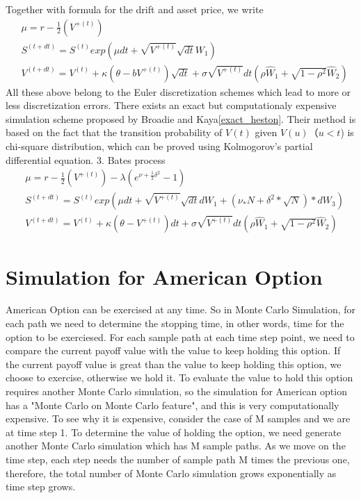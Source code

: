 \documentclass[a4paper]{article}
\begin{document}
Together with formula for the drift and asset price, we write
\begin{align*}
	& \mu = r - \frac{1}{2} (V^{+(t)})\\
	& S^{(t + dt)} = S^{(t)}exp(\mu dt + \sqrt{V^{+(t)}} \sqrt{dt} W_1) \\
	& V^{(t + dt)} = V^{(t)} + \kappa (\theta - b V^{+(t)}) \sqrt{dt} + \sigma \sqrt{V^{+(t)}} dt (\rho \hat W_1
	+ \sqrt{1 - \rho^2} \hat W_2) 
\end{align*}
All these above belong to the Euler discretization schemes which lead to more or less discretization errors. There exists an exact but computationaly expensive simulation scheme proposed by Broadie and Kaya\ref{exact_heston}. Their method is based on the fact that the transition probability of $V(t)$ given $V(u)$（$u < t$) is chi-square distribution, which can be proved using Kolmogorov's partial differential equation. %
3. Bates process\\
\begin{align*}
	& \mu = r - \frac{1}{2} (V^{+(t)}) - \lambda (e^{\nu + \frac{1}{2}\delta^2}  -1) \\
	& S^{(t + dt)} = S^{(t)}exp(\mu dt  + \sqrt{V^{+(t)}} \sqrt{dt} dW_1 
	   + (\nu_*N+\delta^2*\sqrt{N})*dW_3)\\
	& V^{(t + dt)} = V^{(t)} + \kappa(\theta -  V^{+(t)}) dt + \sigma \sqrt{V^{+(t)}} dt (\rho \hat W_1
	+ \sqrt{1 - \rho^2} \hat W_2 )
\end{align*}
\section{Simulation for American Option}
American Option can be exercised at any time. So in Monte Carlo Simulation, for each path we need to determine the stopping time, in other words, time for the option to be exerciesed. For each sample path at each time step point, we need to compare the current payoff value with the value to keep holding this option. If the current payoff value is great than the value to keep holding this option, we choose to exercise, otherwise we hold it. To evaluate the value to hold this option requires another Monte Carlo simulation, so the simulation for American option has a "Monte Carlo on Monte Carlo feature", and this is very computationally expensive. To see why it is expensive, consider the case of M samples and we are at time step 1. To determine the value of holding the option, we need generate another Monte Carlo simulation which has M sample paths. As we move on the time step, each step needs the number of sample path M times the previous one, therefore, the total number of Monte Carlo simulation grows exponentially as time step grows. 
\end{document}
